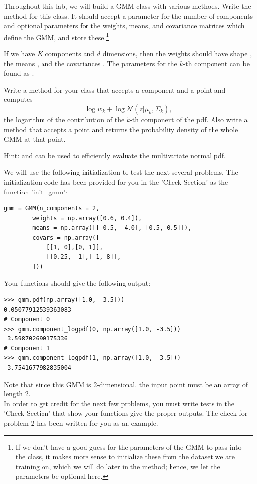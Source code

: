 \begin{problem}
Throughout this lab, we will build a GMM class with various methods.
Write the  method for this class.
It should accept a parameter for the number of components and optional parameters for the weights, means, and covariance matrices which define the GMM, and store these.\footnote{
If we don't have a good guess for the parameters of the GMM to pass into the class, it makes more sense to initialize these from the dataset we are training on, which we will do later in the  method; hence, we let the parameters be optional here.
}

If we have \(K\) components and \(d\) dimensions, then the weights should have shape , the means , and the covariances .
The parameters for the \(k\)-th component can be found as .
\end{problem}
\begin{problem}
Write a method  for your class that accepts a component  and a point  and computes
\[
\log w_k + \log \mathcal{N}(z|\mu_k,\Sigma_k)
,
\]
the logarithm of the contribution of the \(k\)-th component of the pdf.
Also write a method  that accepts a point  and returns the probability density of the whole GMM at that point.

Hint:  and  can be used to efficiently evaluate the multivariate normal pdf.

We will use the following initialization to test the next several problems. The initialization code has been provided for you in the 'Check Section' as the function 'init\_gmm':
\begin{lstlisting}
gmm = GMM(n_components = 2,
        weights = np.array([0.6, 0.4]),
        means = np.array([[-0.5, -4.0], [0.5, 0.5]]),
        covars = np.array([
            [[1, 0],[0, 1]],
            [[0.25, -1],[-1, 8]],
        ]))
\end{lstlisting}
Your functions should give the following output:
\begin{lstlisting}
>>> gmm.pdf(np.array([1.0, -3.5]))
0.05077912539363083
# Component 0
>>> gmm.component_logpdf(0, np.array([1.0, -3.5]))
-3.598702690175336
# Component 1
>>> gmm.component_logpdf(1, np.array([1.0, -3.5]))
-3.7541677982835004
\end{lstlisting}
Note that since this GMM is 2-dimensional, the input point must be an array of length 2. \\
\indent In order to get credit for the next few problems, you must write tests in the 'Check Section' that show your functions give the proper outputs. The check for problem 2 has been written for you as an example.
\label{prob:gmm_has_example}
\end{problem}

